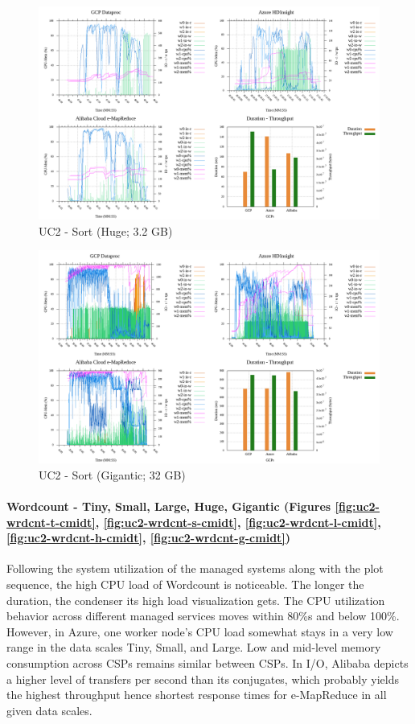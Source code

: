 \documentclass[review]{elsarticle}
\begin{document}
\begin{figure}[p]
	\caption{UC2 - Sort (Huge; 3.2 GB)}
	\label{fig:uc2-srt-h-cmidt}
	\includegraphics[width=\textwidth]{uc2-srt-h-cmidt}
	\centering
\end{figure}

\begin{figure}[p]
	\caption{UC2 - Sort (Gigantic; 32 GB)}
	\label{fig:uc2-srt-g-cmidt}
	\includegraphics[width=\textwidth]{uc2-srt-g-cmidt}
	\centering
\end{figure}


\paragraph{Wordcount - Tiny, Small, Large, Huge, Gigantic (Figures \ref{fig:uc2-wrdcnt-t-cmidt}, \ref{fig:uc2-wrdcnt-s-cmidt}, \ref{fig:uc2-wrdcnt-l-cmidt}, \ref{fig:uc2-wrdcnt-h-cmidt}, \ref{fig:uc2-wrdcnt-g-cmidt})}Following the system utilization of the managed systems along with the plot sequence, the high CPU load of Wordcount is noticeable. The longer the duration, the condenser its high load visualization gets. The CPU utilization behavior across different managed services moves within 80\%s and below 100\%. However, in Azure, one worker node's CPU load somewhat stays in a very low range in the data scales Tiny, Small, and Large. Low and mid-level memory consumption across CSPs remains similar between CSPs. In I/O, Alibaba depicts a higher level of transfers per second than its conjugates, which probably yields the highest throughput hence shortest response times for e-MapReduce in all given data scales.
\end{document}
